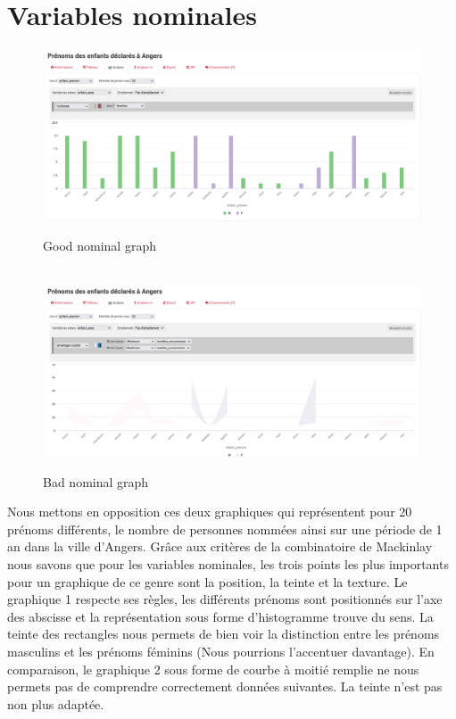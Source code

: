 \documentclass[a4paper,11pt]{article}
\begin{document}
\section{Variables nominales}

\begin{figure}[h] %
	\centering
	\includegraphics[width=1\linewidth]{nominal_ok.png} %
\caption{Good nominal graph } %
	\label{fig3}\hfil\\ %
	
	
	\includegraphics[width=1\linewidth]{nominal_no.png} %
	\caption{Bad nominal graph } %
	\label{fig4} %
\end{figure}
Nous mettons en opposition ces deux graphiques qui représentent pour 20 prénoms différents, le nombre de personnes nommées ainsi sur une période de 1 an dans la ville d'Angers. Grâce aux critères de la combinatoire de Mackinlay nous savons que pour les variables nominales, les trois points les plus importants pour un graphique de ce genre sont la position, la teinte et la texture. Le graphique 1 respecte ses règles, les différents prénoms sont positionnés sur l'axe des abscisse et la représentation sous forme d'histogramme trouve du sens. La teinte des rectangles nous permets de bien voir la distinction entre les prénoms masculins et les prénoms féminins (Nous pourrions l'accentuer davantage). En comparaison, le graphique 2 sous forme de courbe à moitié remplie ne nous permets pas de comprendre correctement données suivantes. La teinte n'est pas non plus adaptée.
\end{document}
